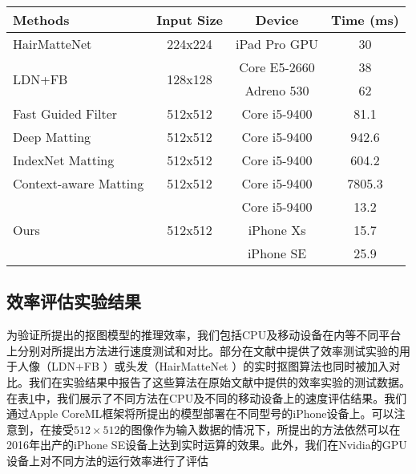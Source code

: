 \begin{table}[t]
	\centering
	\begin{tabular}{lccc}  
		\toprule
		Methods  & Input Size&  Device & Time (ms)   \\
		\midrule\midrule
		HairMatteNet\cite{levinshtein2018real}& 224x224& iPad Pro GPU & 30   \\
		\midrule
		\multirow{2}{*}{LDN+FB\cite{zhu2017fast}} &\multirow{2}{*}{128x128}  &  Core E5-2660 & 38  \\
		&&  Adreno 530 & 62  \\
		\midrule
		\midrule
		Fast Guided Filter\cite{he2015fast} &512x512 & Core i5-9400 & 81.1  \\
		\midrule
		Deep Matting\cite{xu2017deep}& 512x512& Core i5-9400 & 942.6  \\
		\midrule
		IndexNet Matting\cite{lu2019indices} &512x512	& Core i5-9400 & 604.2  \\
		\midrule
		Context-aware Matting\cite{hou2019context}& 512x512	& Core i5-9400 & 7805.3  \\
		\midrule
		\multirow{3}{*}{Ours} &\multirow{3}{*}{512x512}& Core i5-9400 & 13.2  \\
		&& iPhone Xs   & 15.7  \\
		&& iPhone SE  & 25.9   \\
		\bottomrule
	\end{tabular}
	\label{tab6:time_mobie}
\end{table}

\subsection{效率评估实验结果}
为验证所提出的抠图模型的推理效率，我们包括CPU及移动设备在内等不同平台上分别对所提出方法进行速度测试和对比。部分在文献中提供了效率测试实验的用于人像（LDN+FB \cite{zhu2017fast}）或头发（HairMatteNet \cite{levinshtein2018real}）的实时抠图算法也同时被加入对比。我们在实验结果中报告了这些算法在原始文献中提供的效率实验的测试数据。在表\ref{tab6:time_mobie}中，我们展示了不同方法在CPU及不同的移动设备上的速度评估结果。我们通过Apple CoreML框架将所提出的模型部署在不同型号的iPhone设备上。可以注意到，在接受$512\times512$的图像作为输入数据的情况下，所提出的方法依然可以在2016年出产的iPhone SE设备上达到实时运算的效果。此外，我们在Nvidia的GPU设备上对不同方法的运行效率进行了评估

